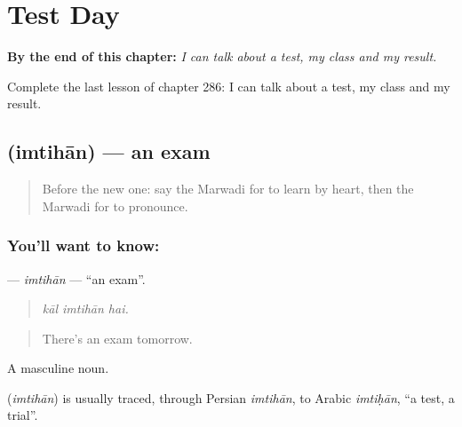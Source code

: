 
\chapter{Test Day}
\label{ch:mw-test-day}

\begin{chapteropening}
\textbf{By the end of this chapter:} \emph{I can talk about a test, my class and my result.}

Complete the last lesson of chapter 286: I can talk about a test, my class and my result.
\end{chapteropening}

\section[\texorpdfstring{\mw{इम्तिहान} (imtihān)}{इम्तिहान (imtihān)}]{ (imtihān) — an exam}

\label{lesson:MW-C286-imtihan}



\begin{quote}
Before the new one: say the Marwadi for to learn by heart, then the Marwadi for to pronounce.
\end{quote}

\subsection*{You'll want to know: }
\textbf{} — \emph{imtihān} — \textquotedblleft{}an exam\textquotedblright{}.

\begin{quote}
  
\end{quote}

\begin{quote}
\emph{kāl imtihān hai.}
\end{quote}

\begin{quote}
There's an exam tomorrow.
\end{quote}

A masculine noun.

\begin{cousinweb}
\textbf{} (\emph{imtihān}) is usually traced, through Persian \emph{imtihān}, to Arabic \emph{imtiḥān}, \textquotedblleft{}a test, a trial\textquotedblright{}.
\end{cousinweb}

